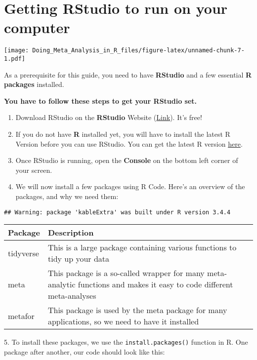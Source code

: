 \documentclass[]{book}
\providecommand{\tightlist}{%
  \setlength{\itemsep}{0pt}\setlength{\parskip}{0pt}}
\theoremstyle{definition}
\theoremstyle{definition}
\theoremstyle{definition}
\theoremstyle{remark}
\begin{document}
\hypertarget{RStudio}{\section{Getting RStudio to run on your
computer}\label{RStudio}}

\texttt{[image: Doing\_Meta\_Analysis\_in\_R\_files/figure-latex/unnamed-chunk-7-1.pdf]}

As a prerequisite for this guide, you need to have \textbf{RStudio} and
a few essential \textbf{R packages} installed.

\textbf{You have to follow these steps to get your RStudio set.}

\begin{enumerate}
\def\labelenumi{\arabic{enumi}.}
\tightlist
\item
  Download RStudio on the \textbf{RStudio} Website
  (\href{https://www.rstudio.com/products/rstudio/download/}{Link}).
  It's free!
\item
  If you do not have \textbf{R} installed yet, you will have to install
  the latest R Version before you can use RStudio. You can get the
  latest R version
  \href{https://cran.r-project.org/bin/windows/base/}{here}.
\item
  Once RStudio is running, open the \textbf{Console} on the bottom left
  corner of your screen.
\item
  We will now install a few packages using R Code. Here's an overview of
  the packages, and why we need them:
\end{enumerate}

\begin{verbatim}
## Warning: package 'kableExtra' was built under R version 3.4.4
\end{verbatim}

\begin{tabular}{l|l}
\hline
Package & Description\\
\hline
tidyverse & This is a large package containing various functions to tidy up your data\\
\hline
meta & This package is a so-called wrapper for many meta-analytic functions and makes it easy to code different meta-analyses\\
\hline
metafor & This package is used by the meta package for many applications, so we need to have it installed\\
\hline
\end{tabular}

 5. To install these packages, we use the \texttt{install.packages()}
function in R. One package after another, our code should look like
this:
\end{document}

